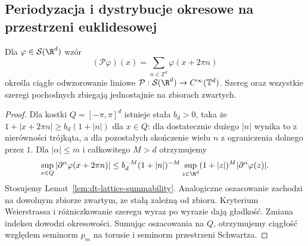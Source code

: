 \subsection{Periodyzacja i dystrybucje okresowe na przestrzeni euklidesowej}

\begin{stwierdzenie}
\label{prop:dt-periodization-schwartz}
Dla $\varphi\in\mathcal S(\R^d)$ wzór
\[
 (\mathcal P\varphi)(x)=\sum_{n\in\mathbb Z^d}
 \varphi(x+2\pi n)
\]
określa ciągłe odwzorowanie liniowe
$\mathcal P:\mathcal S(\R^d)\to C^\infty(\mathbb T^d)$.
Szereg oraz wszystkie szeregi pochodnych
zbiegają jednostajnie na zbiorach zwartych.
\end{stwierdzenie}
\begin{proof}
Dla kostki $Q=[-\pi,\pi]^d$ istnieje stała $b_d>0$,
taka że $1+|x+2\pi n|\ge b_d(1+|n|)$ dla $x\in Q$:
dla dostatecznie dużego $|n|$ wynika to
z nierówności trójkąta, a dla pozostałych
skończenie wielu $n$ z ograniczenia dolnego przez $1$.
Dla $|\alpha|\le m$ i całkowitego $M>d$
otrzymujemy
\[
 \sup_{x\in Q}|\partial^\alpha\varphi(x+2\pi n)|
 \le b_d^{-M}(1+|n|)^{-M}
 \sup_{z\in\R^d}(1+|z|)^M|\partial^\alpha\varphi(z)|.
\]
Stosujemy Lemat~\ref{lem:dt-lattice-summability}.
Analogiczne oszacowanie zachodzi na dowolnym
zbiorze zwartym, ze stałą zależną od zbioru.
Kryterium Weierstrassa i różniczkowanie
szeregu wyraz po wyrazie dają gładkość.
Zmiana indeksu dowodzi okresowości.
Sumując oszacowania na $Q$, otrzymujemy
ciągłość względem seminorm $p_m$ na torusie
i seminorm przestrzeni Schwartza.
\end{proof}

